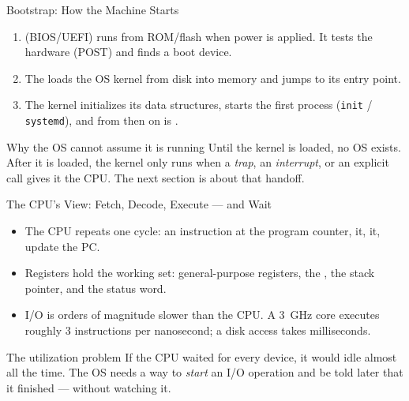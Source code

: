 \documentclass[aspectratio=169]{beamer}
\begin{document}
\begin{frame}{Bootstrap: How the Machine Starts}
  \begin{enumerate}
    \item {} (BIOS/UEFI) runs from ROM/flash when power is applied.
      It tests the hardware (POST) and finds a boot device.
    \item The  loads the OS kernel from disk into memory
      and jumps to its entry point.
    \item The kernel initializes its data structures, starts the first process
      (\texttt{init} / \texttt{systemd}), and from then on is .
  \end{enumerate}
  \vspace{0.2cm}
  \begin{alertblock}{Why the OS cannot assume it is running}
    Until the kernel is loaded, no OS exists. After it is loaded, the kernel
    only runs when a \emph{trap}, an \emph{interrupt}, or an explicit call gives
    it the CPU. The next section is about that handoff.
  \end{alertblock}
  \vspace{0.1cm}
\end{frame}

\begin{frame}{The CPU's View: Fetch, Decode, Execute --- and Wait}
  \begin{itemize}
    \item The CPU repeats one cycle:  an instruction at the program
      counter,  it,  it, update the PC.
    \item Registers hold the working set: general-purpose registers, the
      , the stack pointer, and the status word.
    \item I/O is orders of magnitude slower than the CPU. A 3~GHz core executes
      roughly 3 instructions per nanosecond; a disk access takes milliseconds.
  \end{itemize}
  \vspace{0.2cm}
  \begin{block}{The utilization problem}
    If the CPU waited for every device, it would idle almost all the time.
    The OS needs a way to \emph{start} an I/O operation and be told later that it
    finished --- without watching it.
  \end{block}
  \vspace{0.1cm}
\end{frame}
\end{document}
